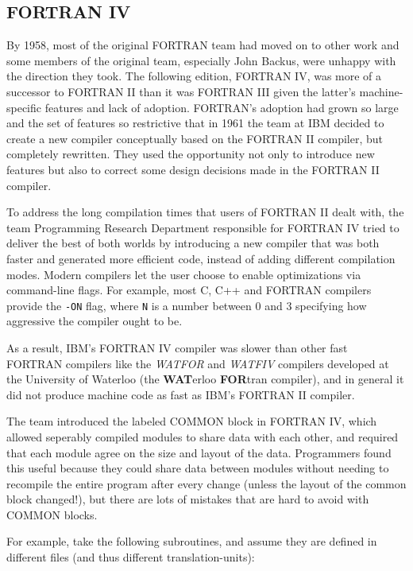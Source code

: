\subsection{FORTRAN IV}

By 1958, most of the original FORTRAN team had moved on to other work and
some members of the original team, especially John Backus, were unhappy with
the direction they took.
The following edition, FORTRAN IV, was more of a successor to FORTRAN II than
it was FORTRAN III given the latter's machine-specific features and
lack of adoption.
FORTRAN's adoption had grown so large and the set of features so restrictive
that in 1961 the team at IBM decided to create a new compiler conceptually
based on the FORTRAN II compiler, but completely rewritten.
They used the opportunity not only to introduce new features but also to
correct some design decisions made in the FORTRAN II compiler.

To address the long compilation times that users of FORTRAN II dealt with,
the team Programming Research Department responsible for FORTRAN IV
tried to deliver the best of both worlds by introducing a new compiler
that was both faster and generated more efficient code, instead of adding
different compilation modes. Modern compilers let the user choose to enable
optimizations via command-line flags. For example, most C, C++ and FORTRAN compilers
provide the \texttt{-ON} flag, where \texttt{N} is a number
between 0 and 3 specifying how aggressive the compiler ought to be.

As a result, IBM's FORTRAN IV compiler was slower than other fast FORTRAN compilers
like the \textit{WATFOR} and \textit{WATFIV} compilers developed at the University of Waterloo
(the \textbf{WAT}erloo \textbf{FOR}tran compiler\cite{cress_dirksen_graham_watfor_fortran_iv_1970}),
and in general it did not produce machine code as fast as IBM's FORTRAN II compiler.

The team introduced the labeled COMMON block in FORTRAN IV, which allowed
seperably compiled modules to share data with each other,
and required that each module agree on the size and layout of the data.
Programmers found this useful because they could share data between modules
without needing to recompile the entire program after every change
(unless the layout of the common block changed!),
but there are lots of mistakes that are hard to avoid with COMMON blocks.

For example, take the following subroutines, and assume they are
defined in different files (and thus different \gls{translation-unit}s):

